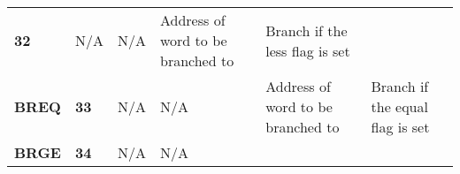 \documentclass[]{article}
\begin{document}
\begin{longtable}[c]{@{}llllll@{}}
\begin{minipage}[t]{0.14\columnwidth}\raggedright\strut
\textbf{32}
\strut\end{minipage} &
\begin{minipage}[t]{0.14\columnwidth}\raggedright\strut
N/A
\strut\end{minipage} &
\begin{minipage}[t]{0.14\columnwidth}\raggedright\strut
N/A
\strut\end{minipage} &
\begin{minipage}[t]{0.14\columnwidth}\raggedright\strut
Address of word to be branched to
\strut\end{minipage} &
\begin{minipage}[t]{0.14\columnwidth}\raggedright\strut
Branch if the less flag is set
\strut\end{minipage}\tabularnewline
\begin{minipage}[t]{0.14\columnwidth}\raggedright\strut
\textbf{BREQ}
\strut\end{minipage} &
\begin{minipage}[t]{0.14\columnwidth}\raggedright\strut
\textbf{33}
\strut\end{minipage} &
\begin{minipage}[t]{0.14\columnwidth}\raggedright\strut
N/A
\strut\end{minipage} &
\begin{minipage}[t]{0.14\columnwidth}\raggedright\strut
N/A
\strut\end{minipage} &
\begin{minipage}[t]{0.14\columnwidth}\raggedright\strut
Address of word to be branched to
\strut\end{minipage} &
\begin{minipage}[t]{0.14\columnwidth}\raggedright\strut
Branch if the equal flag is set
\strut\end{minipage}\tabularnewline
\begin{minipage}[t]{0.14\columnwidth}\raggedright\strut
\textbf{BRGE}
\strut\end{minipage} &
\begin{minipage}[t]{0.14\columnwidth}\raggedright\strut
\textbf{34}
\strut\end{minipage} &
\begin{minipage}[t]{0.14\columnwidth}\raggedright\strut
N/A
\strut\end{minipage} &
\begin{minipage}[t]{0.14\columnwidth}\raggedright\strut
N/A
\strut\end{minipage} &

\end{longtable}
\end{document}
